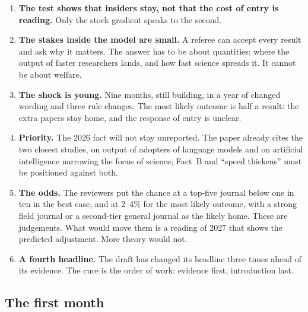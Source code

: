 \begin{enumerate}
\item \textbf{The test shows that insiders stay, not that the cost of entry is reading.} Only the stock gradient speaks to the second.
\item \textbf{The stakes inside the model are small.} A referee can accept every result and ask why it matters. The answer has to be about quantities: where the output of faster researchers lands, and how fast science spreads it. It cannot be about welfare.
\item \textbf{The shock is young.} Nine months, still building, in a year of changed wording and three rule changes. The most likely outcome is half a result: the extra papers stay home, and the response of entry is unclear.
\item \textbf{Priority.} The 2026 fact will not stay unreported. The paper already cites the two closest studies, on output of adopters of language models and on artificial intelligence narrowing the focus of science; Fact~B and ``speed thickens'' must be positioned against both.
\item \textbf{The odds.} The reviewers put the chance at a top-five journal below one in ten in the best case, and at 2--4\% for the most likely outcome, with a strong field journal or a second-tier general journal as the likely home. These are judgements. What would move them is a reading of 2027 that shows the predicted adjustment. More theory would not.
\item \textbf{A fourth headline.} The draft has changed its headline three times ahead of its evidence. The cure is the order of work: evidence first, introduction last.
\end{enumerate}

\subsection{The first month}

